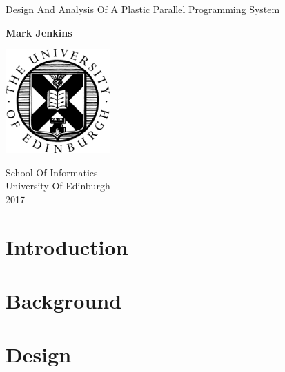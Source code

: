 \documentclass{report}
\begin{document}
\begin{titlepage}
    \begin{center}
        \vspace*{1cm}
        
        \Huge
        Design And Analysis Of A Plastic Parallel Programming System
        
        \vspace{1.5cm}
        
        \large
        \textbf{Mark Jenkins}
        
        \vspace{3.5cm}

        \includegraphics[width=0.3\textwidth]{university}

        \vspace{3.5cm}
        
        School Of Informatics\\
        University Of Edinburgh\\
        2017
        
    \end{center}
\end{titlepage}

\setlength\parskip{1em}
\setlength\parindent{0pt}



\tableofcontents

\newpage

\chapter{Introduction}
\label{chapter:introduction}


\chapter{Background}
\label{chapter:background}


\chapter{Design}
\label{chapter:design}

\end{document}
